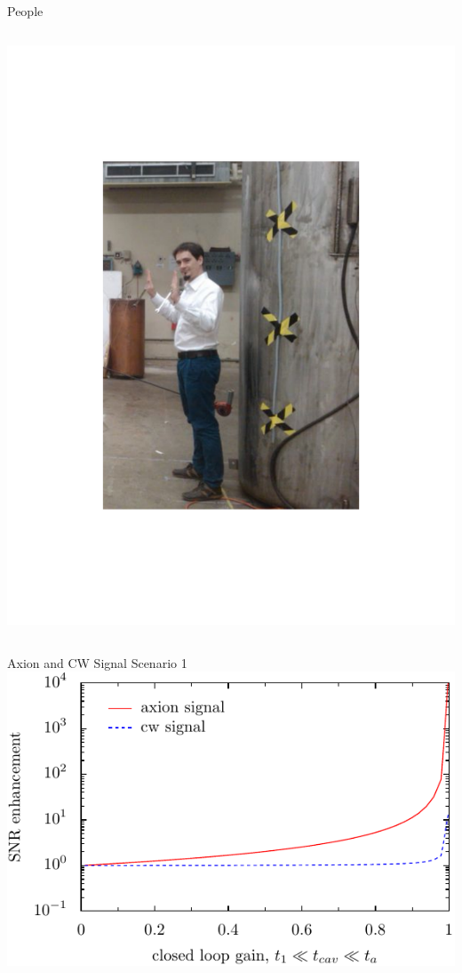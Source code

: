 \documentclass{beamer}
\begin{document}
\begin{frame}{People}
\begin{columns}
\includegraphics[width=\textwidth]{gray_pic}

\end{columns}
\end{frame}

\begin{frame}{Axion and CW Signal}
{\tiny Scenario 1}
\includegraphics[width=\textwidth]{first_limit}

\end{frame}
\end{document}
